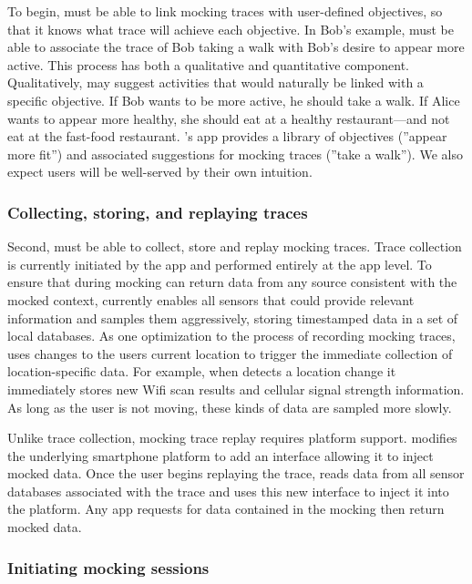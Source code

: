 To begin, \PocketMocker{} must be able to link mocking traces with
user-defined objectives, so that it knows what trace will achieve each
objective. In Bob's example, \PocketMocker{} must be able to associate the
trace of Bob taking a walk with Bob's desire to appear more active. This
process has both a qualitative and quantitative component. Qualitatively,
\PocketMocker{} may suggest activities that would naturally be linked with a
specific objective. If Bob wants to be more active, he should take a walk. If
Alice wants to appear more healthy, she should eat at a healthy
restaurant---and not eat at the fast-food restaurant. \PocketMocker{}'s app
provides a library of objectives (''appear more fit'') and associated
suggestions for mocking traces (''take a walk''). We also expect users will
be well-served by their own intuition.

\subsubsection{Collecting, storing, and replaying traces}

Second, \PocketMocker{} must be able to collect, store and replay mocking
traces. Trace collection is currently initiated by the \PocketMocker{} app and
performed entirely at the app level. To ensure that during mocking
\PocketMocker{} can return data from any source consistent with the mocked
context, \PocketMocker{} currently enables all sensors that could provide
relevant information and samples them aggressively, storing timestamped data in
a set of local databases. As one optimization to the process of recording
mocking traces, \PocketMocker{} uses changes to the users current location to
trigger the immediate collection of location-specific data. For example, when
\PocketMocker{} detects a location change it immediately stores new Wifi scan
results and cellular signal strength information. As long as the user is not
moving, these kinds of data are sampled more slowly.

Unlike trace collection, mocking trace replay requires platform support.
\PocketMocker{} modifies the underlying smartphone platform to add an
interface allowing it to inject mocked data. Once the user begins replaying
the trace, \PocketMocker{} reads data from all sensor databases associated
with the trace and uses this new interface to inject it into the platform.
Any app requests for data contained in the mocking then return mocked data.

\subsubsection{Initiating mocking sessions}

